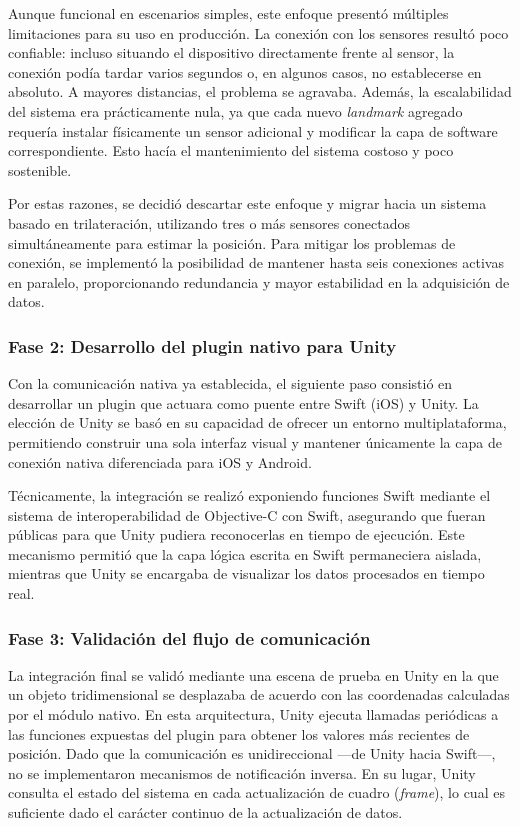 Aunque funcional en escenarios simples, este enfoque presentó múltiples limitaciones para su uso en producción. La conexión con los sensores resultó poco confiable: incluso situando el dispositivo directamente frente al sensor, la conexión podía tardar varios segundos o, en algunos casos, no establecerse en absoluto. A mayores distancias, el problema se agravaba. Además, la escalabilidad del sistema era prácticamente nula, ya que cada nuevo \textit{landmark} agregado requería instalar físicamente un sensor adicional y modificar la capa de software correspondiente. Esto hacía el mantenimiento del sistema costoso y poco sostenible.

Por estas razones, se decidió descartar este enfoque y migrar hacia un sistema basado en trilateración, utilizando tres o más sensores conectados simultáneamente para estimar la posición. Para mitigar los problemas de conexión, se implementó la posibilidad de mantener hasta seis conexiones activas en paralelo, proporcionando redundancia y mayor estabilidad en la adquisición de datos.

\subsubsection*{Fase 2: Desarrollo del plugin nativo para Unity}

Con la comunicación nativa ya establecida, el siguiente paso consistió en desarrollar un plugin que actuara como puente entre Swift (iOS) y Unity. La elección de Unity se basó en su capacidad de ofrecer un entorno multiplataforma, permitiendo construir una sola interfaz visual y mantener únicamente la capa de conexión nativa diferenciada para iOS y Android. 

Técnicamente, la integración se realizó exponiendo funciones Swift mediante el sistema de interoperabilidad de Objective-C con Swift, asegurando que fueran públicas para que Unity pudiera reconocerlas en tiempo de ejecución. Este mecanismo permitió que la capa lógica escrita en Swift permaneciera aislada, mientras que Unity se encargaba de visualizar los datos procesados en tiempo real.

\subsubsection*{Fase 3: Validación del flujo de comunicación}

La integración final se validó mediante una escena de prueba en Unity en la que un objeto tridimensional se desplazaba de acuerdo con las coordenadas calculadas por el módulo nativo. En esta arquitectura, Unity ejecuta llamadas periódicas a las funciones expuestas del plugin para obtener los valores más recientes de posición. Dado que la comunicación es unidireccional —de Unity hacia Swift—, no se implementaron mecanismos de notificación inversa. En su lugar, Unity consulta el estado del sistema en cada actualización de cuadro (\textit{frame}), lo cual es suficiente dado el carácter continuo de la actualización de datos.

